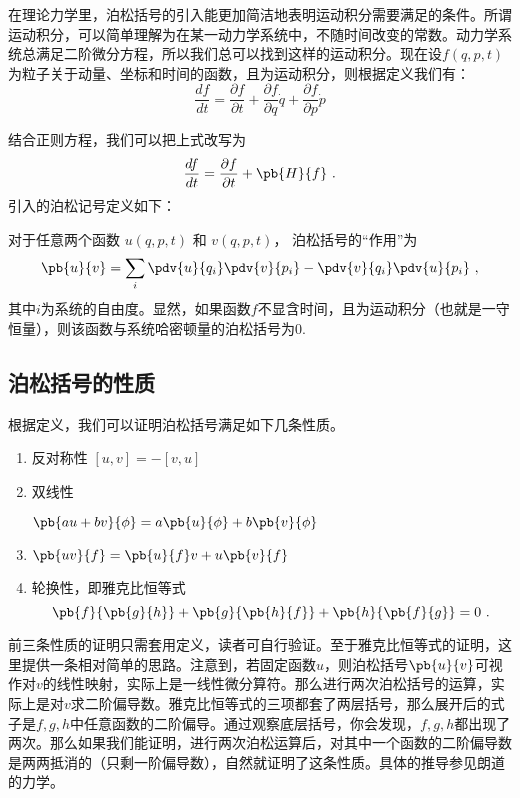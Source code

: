 
\begin{issues}
\issueDraft
\end{issues}

在理论力学里，泊松括号的引入能更加简洁地表明运动积分需要满足的条件。所谓运动积分，可以简单理解为在某一动力学系统中，不随时间改变的常数。动力学系统总满足二阶微分方程，所以我们总可以找到这样的运动积分。现在设$f(q,p,t)$为粒子关于动量、坐标和时间的函数，且为运动积分，则根据定义我们有：
\begin{equation}
\frac{df}{dt}=\frac{\partial f}{\partial t}+\frac{\partial f}{\partial q}\dot{q}+\frac{\partial f}{\partial p}\dot{ p}
\end{equation}

结合正则方程，我们可以把上式改写为
\begin{equation}\label{eq_poison_10}
\frac{df}{dt}=\frac{\partial f}{\partial t}+\pb{H}{f}~.
\end{equation}
引入的泊松记号定义如下：


对于任意两个函数 $u(q, p, t)$ 和 $v(q, p, t)$， 泊松括号的“作用”为
\begin{equation}
\pb{u}{v} = \sum_i \pdv{u}{q_i}\pdv{v}{p_i} - \pdv{v}{q_i}\pdv{u}{p_i}~,
\end{equation}
其中$i$为系统的自由度。显然，如果函数$f$不显含时间，且为运动积分（也就是一守恒量），则该函数与系统哈密顿量的泊松括号为0.

\subsection{泊松括号的性质}
根据定义，我们可以证明泊松括号满足如下几条性质。
\begin{enumerate}
\item 反对称性
$[u,v]=-[v,u]$
\item 双线性

$\pb{au+bv}{\phi}=a\pb{u}{\phi}+b\pb{v}{\phi}$
\item 
$\pb{uv}{f}=\pb{u}{f}v+u\pb{v}{f}$

\item 轮换性，即雅克比恒等式
\begin{equation}
\pb{f}{\pb{g}{h}}+\pb{g}{\pb{h}{f}}+\pb{h}{\pb{f}{g}}=0~.
\end{equation}
\end{enumerate}
前三条性质的证明只需套用定义，读者可自行验证。至于雅克比恒等式的证明，这里提供一条相对简单的思路。注意到，若固定函数$u$，则泊松括号$\pb{u}{v}$可视作对$v$的线性映射，实际上是一线性微分算符。那么进行两次泊松括号的运算，实际上是对$v$求二阶偏导数。雅克比恒等式的三项都套了两层括号，那么展开后的式子是$f,g,h$中任意函数的二阶偏导。通过观察底层括号，你会发现，$f,g,h$都出现了两次。那么如果我们能证明，进行两次泊松运算后，对其中一个函数的二阶偏导数是两两抵消的（只剩一阶偏导数），自然就证明了这条性质。具体的推导参见朗道的力学。

